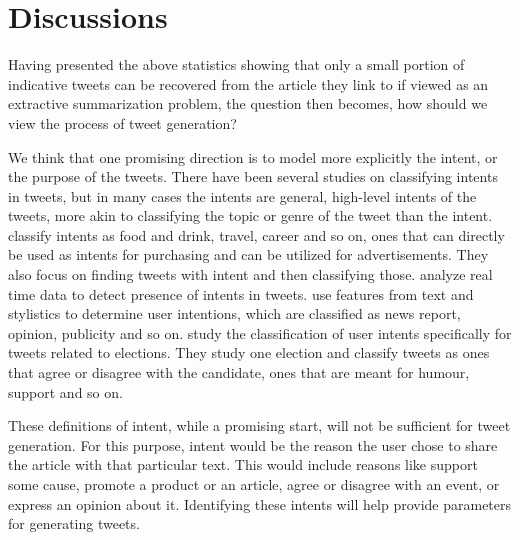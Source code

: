 \section{Discussions}
Having presented the above statistics showing that only a small portion of indicative tweets can be recovered from the article they link to if viewed as an extractive summarization problem, the question then becomes, how should we view the process of tweet generation?

We think that one promising direction is to model more explicitly the intent, or the purpose of the tweets. There have been several studies on classifying intents in tweets, but in many cases the intents are general, high-level intents of the tweets, more akin to classifying the topic or genre of the tweet than the intent.  classify intents as food and drink, travel, career and so on, ones that can directly be used as intents for purchasing and can be utilized for advertisements. They also focus on finding tweets with intent and then classifying those.  analyze real time data to detect presence of intents in tweets.  use features from text and stylistics to determine user intentions, which are classified as news report, opinion, publicity and so on.  study the classification of user intents specifically for tweets related to elections. They study one election and classify tweets as ones that agree or disagree with the candidate, ones that are meant for humour, support and so on. 

These definitions of intent, while a promising start, will not be sufficient for tweet generation. For this purpose, intent would be the reason the user chose to share the article with that particular text. This would include reasons like support some cause, promote a product or an article, agree or disagree with an event, or express an opinion about it. Identifying these intents will help provide parameters for generating tweets. 